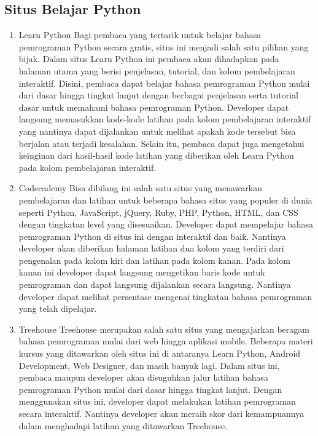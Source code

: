 \subsection{Situs Belajar Python} 
\begin{enumerate}
\item Learn Python
Bagi pembaca yang tertarik untuk belajar bahasa pemrograman
Python secara gratis, situs ini menjadi salah satu pilihan
yang bijak. Dalam situs Learn Python ini pembaca akan
dihadapkan pada halaman utama yang berisi penjelasan,
tutorial, dan kolom pembelajaran interaktif.
Disini, pembaca dapat belajar bahasa pemrograman Python
mulai dari dasar hingga tingkat lanjut dengan berbagai penjelasan
serta tutorial dasar untuk memahami bahasa pemrograman
Python. Developer dapat langsung memasukkan
kode-kode latihan pada kolom pembelajaran interaktif yang
nantinya dapat dijalankan untuk melihat apakah kode tersebut
bisa berjalan atau terjadi kesalahan.
Selain itu, pembaca dapat juga mengetahui keinginan dari
hasil-hasil kode latihan yang diberikan oleh Learn Python
pada kolom pembelajaran interaktif.

\item Codecademy
Bisa dibilang ini salah satu situs yang menawarkan pembelajaran 
dan latihan untuk beberapa bahasa situs yang 
populer di dunia seperti Python, JavaScript, jQuery, Ruby, 
PHP, Python, HTML, dan CSS dengan tingkatan level yang 
disesuaikan. 
Developer dapat mempelajar bahasa pemrograman Python 
di situs ini dengan interaktif dan baik. Nantinya developer 
akan diberikan halaman latihan dua kolom yang terdiri dari 
pengenalan pada kolom kiri dan latihan pada kolom kanan. 
Pada kolom kanan ini developer dapat langsung mengetikan 
baris kode untuk pemrograman dan dapat langsung dijalankan 
secara langsung. Nantinya developer dapat melihat 
persentase mengenai tingkatan bahasa pemrograman yang 
telah dipelajar.

\item Treehouse
Treehouse merupakan salah satu situs yang mengajarkan 
beragam bahasa pemrograman mulai dari web hingga aplikasi 
mobile. Beberapa materi kursus yang ditawarkan oleh 
situs ini di antaranya Learn Python, Android Development, 
Web Designer, dan masih banyak lagi. 
Dalam situs ini, pembaca maupun developer akan disuguhkan 
jalur latihan bahasa pemrograman Python mulai dari 
dasar hingga tingkat lanjut. Dengan menggunakan situs 
ini, developer dapat melakukan latihan pemrograman secara 
interaktif. 
Nantinya developer akan meraih skor dari kemampuannya 
dalam menghadapi latihan yang ditawarkan Treehouse.


\end{enumerate}
